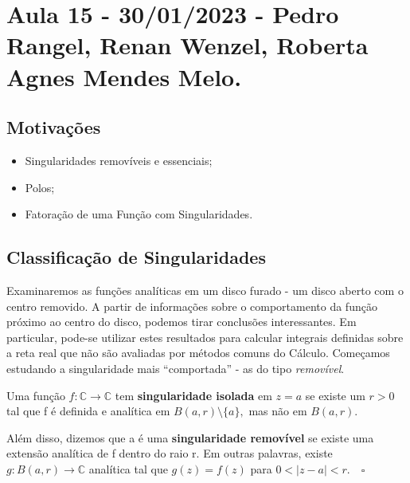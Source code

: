 \documentclass[complex.tex]{subfiles}
\begin{document}
\section{Aula 15 - 30/01/2023 - Pedro Rangel, Renan Wenzel, Roberta Agnes Mendes Melo.}
\subsection{Motivações}
\begin{itemize}
	\item Singularidades removíveis e essenciais;
	\item Polos;
	\item Fatoração de uma Função com Singularidades.
\end{itemize}
\subsection{Classificação de Singularidades}
Examinaremos as funções analíticas em um disco furado - um disco aberto com o centro removido. A partir de informações sobre
o comportamento da função próximo ao centro do disco, podemos tirar conclusões interessantes. Em particular, pode-se utilizar estes resultados
para calcular integrais definidas sobre a reta real que não são avaliadas por métodos comuns do Cálculo.
Começamos estudando a singularidade mais ``comportada'' - as do tipo \textit{removível}.
\begin{def*}
	Uma função \(f:\mathbb{C}\rightarrow \mathbb{C}\) tem \textbf{singularidade isolada} em \(z = a\) se existe um \(r > 0\)
	tal que f é definida e analítica em \(B(a, r)\setminus{\{a\}},\) mas não em \(B(a, r).\)

	Além disso, dizemos que a é uma \textbf{singularidade removível} se existe uma extensão analítica de f dentro do raio r.
	Em outras palavras, existe \(g:B(a, r)\rightarrow \mathbb{C}\) analítica tal que \(g(z) = f(z)\) para \(0 < |z-a| < r.\quad \square\)
\end{def*}
\end{document}
